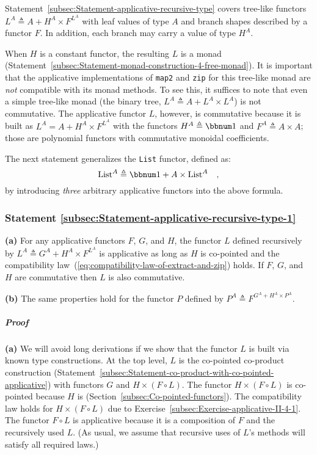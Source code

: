 Statement~\ref{subsec:Statement-applicative-recursive-type} covers
tree-like functors $L^{A}\triangleq A+H^{A}\times F^{L^{A}}$ with
leaf values of type $A$ and branch shapes described by a functor
$F$. In addition, each branch may carry a value of type $H^{A}$.

When $H$ is a constant functor, the resulting $L$ is a monad (Statement~\ref{subsec:Statement-monad-construction-4-free-monad}).
It is important that the applicative implementations of \lstinline!map2!
and \lstinline!zip! for this tree-like monad are \emph{not} compatible
with its monad methods. To see this, it suffices to note that even
a simple tree-like monad (the binary tree, $L^{A}\triangleq A+L^{A}\times L^{A}$)
is not commutative. The applicative functor $L$, however, is commutative
because it is built as $L^{A}=A+H^{A}\times F^{L^{A}}$ with the functors
$H^{A}\triangleq\bbnum 1$ and $F^{A}\triangleq A\times A$; those
are polynomial functors with commutative monoidal coefficients.

The next statement generalizes the \lstinline!List! functor, defined
as:
\[
\text{List}^{A}\triangleq\bbnum 1+A\times\text{List}^{A}\quad,
\]
by introducing \emph{three} arbitrary applicative functors into the
above formula.

\subsubsection{Statement \label{subsec:Statement-applicative-recursive-type-1}\ref{subsec:Statement-applicative-recursive-type-1}}

\textbf{(a)} For any applicative functors $F$, $G$, and $H$, the
functor $L$ defined recursively by $L^{A}\triangleq G^{A}+H^{A}\times F^{L^{A}}$
is applicative as long as $H$ is co-pointed and the compatibility
law~(\ref{eq:compatibility-law-of-extract-and-zip}) holds. If $F$,
$G$, and $H$ are commutative then $L$ is also commutative.

\textbf{(b)} The same properties hold for the functor $P$ defined
by $P^{A}\triangleq F^{G^{A}+H^{A}\times P^{A}}$.

\subparagraph{Proof}

\textbf{(a)} We will avoid long derivations if we show that the functor
$L$ is built via known type constructions. At the top level, $L$
is the co-pointed co-product construction (Statement~\ref{subsec:Statement-co-product-with-co-pointed-applicative})
with functors $G$ and $H\times(F\circ L)$. The functor $H\times(F\circ L)$
is co-pointed because $H$ is (Section~\ref{subsec:Co-pointed-functors}).
The compatibility law holds for $H\times(F\circ L)$ due to Exercise~\ref{subsec:Exercise-applicative-II-4-1}.
The functor $F\circ L$ is applicative because it is a composition
of $F$ and the recursively used $L$. (As usual, we assume that recursive
uses of $L$\textsf{'}s methods will satisfy all required laws.)

